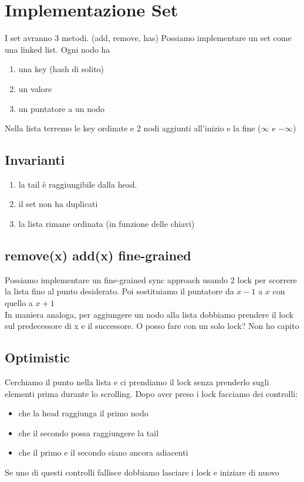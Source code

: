 \documentclass{article}
\begin{document}
\section{Implementazione Set}
I set avranno 3 metodi. (add, remove, has)
Possiamo implementare un set come una linked list. Ogni nodo ha \begin{enumerate}
    \item una key (hash di solito)
    \item un valore
    \item un puntatore a un nodo
\end{enumerate}
Nella lista terremo le key ordinate e 2 nodi aggiunti all'inizio e la fine ($\infty$ e $-\infty$)

\subsection{Invarianti}
\begin{enumerate}
    \item la tail è raggiungibile dalla head.
    \item il set non ha duplicati
    \item la lista rimane ordinata (in funzione delle chiavi)
\end{enumerate}

\subsection{remove(x) add(x) fine-grained}
Possiamo implementare un fine-grained sync approach usando 2 lock per scorrere la lista fino al punto desiderato. Poi sostituiamo il puntatore da $x-1$ a $x$ con quello a $x+1$ \\
In maniera analoga, per aggiungere un nodo alla lista dobbiamo prendere il lock sul predecessore di x e il successore. O posso fare con un solo lock? Non ho capito

\subsection{Optimistic}
Cerchiamo il punto nella lista e ci prendiamo il lock senza prenderlo sugli elementi prima durante lo scrolling.
Dopo aver preso i lock facciamo dei controlli: \begin{itemize}
    \item che la head raggiunga il primo nodo
    \item che il secondo possa raggiungere la tail
    \item che il primo e il secondo siano ancora adiacenti
\end{itemize}
Se uno di questi controlli fallisce dobbiamo lasciare i lock e iniziare di nuovo
\end{document}
